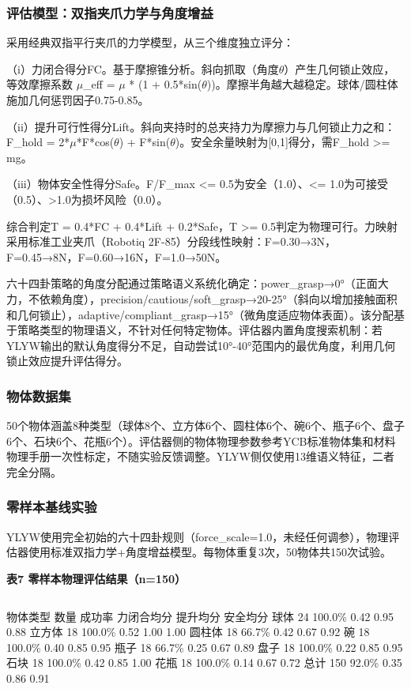 \documentclass[12pt,a4paper]{article}
\begin{document}
\subsubsection{评估模型：双指夹爪力学与角度增益}

采用经典双指平行夹爪的力学模型，从三个维度独立评分：

（i）力闭合得分FC。基于摩擦锥分析。斜向抓取（角度$\theta$）产生几何锁止效应，等效摩擦系数 $\mu$\_eff = $\mu$ * (1 + 0.5*sin($\theta$))。摩擦半角越大越稳定。球体/圆柱体施加几何惩罚因子0.75-0.85。

（ii）提升可行性得分Lift。斜向夹持时的总夹持力为摩擦力与几何锁止力之和：F\_hold = 2*$\mu$*F*cos($\theta$) + F*sin($\theta$)。安全余量映射为[0,1]得分，需F\_hold >= mg。

（iii）物体安全性得分Safe。F/F\_max <= 0.5为安全（1.0）、<= 1.0为可接受（0.5）、>1.0为损坏风险（0.0）。

综合判定T = 0.4*FC + 0.4*Lift + 0.2*Safe，T >= 0.5判定为物理可行。力映射采用标准工业夹爪（Robotiq 2F-85）分段线性映射：F=0.30→3N，F=0.45→8N，F=0.60→16N，F=1.0→50N。

六十四卦策略的角度分配通过策略语义系统化确定：power\_grasp→0°（正面大力，不依赖角度），precision/cautious/soft\_grasp→20-25°（斜向以增加接触面积和几何锁止），adaptive/compliant\_grasp→15°（微角度适应物体表面）。该分配基于策略类型的物理语义，不针对任何特定物体。评估器内置角度搜索机制：若YLYW输出的默认角度得分不足，自动尝试10°-40°范围内的最优角度，利用几何锁止效应提升评估得分。
\subsubsection{物体数据集}

50个物体涵盖8种类型（球体8个、立方体6个、圆柱体6个、碗6个、瓶子6个、盘子6个、石块6个、花瓶6个）。评估器侧的物体物理参数参考YCB标准物体集和材料物理手册一次性标定，不随实验反馈调整。YLYW侧仅使用13维语义特征，二者完全分隔。
\subsubsection{零样本基线实验}

YLYW使用完全初始的六十四卦规则（force\_scale=1.0，未经任何调参），物理评估器使用标准双指力学+角度增益模型。每物体重复3次，50物体共150次试验。

\begin{center}
\textbf{表7  零样本物理评估结果（n=150）}
\begin{tabular}{lcccc}
\hline
\end{tabular}
\end{center}
物体类型    数量  成功率  力闭合均分  提升均分  安全均分
球体        24    100.0\%  0.42       0.95       0.88
立方体      18    100.0\%  0.52       1.00       1.00
圆柱体      18    66.7\%   0.42       0.67       0.92
碗          18    100.0\%  0.40       0.85       0.95
瓶子        18    66.7\%   0.25       0.67       0.89
盘子        18    100.0\%  0.22       0.85       0.95
石块        18    100.0\%  0.42       0.85       1.00
花瓶        18    100.0\%  0.14       0.67       0.72
总计       150    92.0\%   0.35       0.86       0.91
\end{document}
